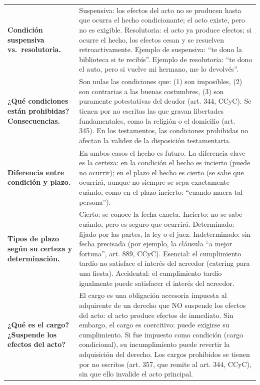 \documentclass[12pt,oneside]{book}
\begin{document}
\begin{longtable}{
    >{\raggedright\arraybackslash}p{}
    >{\raggedright\arraybackslash}X
}
\textbf{Condición suspensiva vs.\ resolutoria.} &
Suspensiva: los efectos del acto no se producen hasta que ocurra el hecho condicionante; el acto existe, pero no es exigible. Resolutoria: el acto ya produce efectos; si ocurre el hecho, los efectos cesan y se resuelven retroactivamente. Ejemplo de suspensiva: ``te dono la biblioteca si te recibís''. Ejemplo de resolutoria: ``te dono el auto, pero si vuelve mi hermano, me lo devolvés''. \\

\textbf{¿Qué condiciones están prohibidas? Consecuencias.} &
Son nulas las condiciones que: (1) son imposibles, (2) son contrarias a las buenas costumbres, (3) son puramente potestativas del deudor (art. 344, CCyC). Se tienen por no escritas las que gravan libertades fundamentales, como la religión o el domicilio (art. 345). En los testamentos, las condiciones prohibidas no afectan la validez de la disposición testamentaria. \\

\textbf{Diferencia entre condición y plazo.} &
En ambos casos el hecho es futuro. La diferencia clave es la certeza: en la condición el hecho es incierto (puede no ocurrir); en el plazo el hecho es cierto (se sabe que ocurrirá, aunque no siempre se sepa exactamente cuándo, como en el plazo incierto: ``cuando muera tal persona''). \\

\textbf{Tipos de plazo según su certeza y determinación.} &
Cierto: se conoce la fecha exacta. Incierto: no se sabe cuándo, pero es seguro que ocurrirá. Determinado: fijado por las partes, la ley o el juez. Indeterminado: sin fecha precisada (por ejemplo, la cláusula ``a mejor fortuna'', art. 889, CCyC). Esencial: el cumplimiento tardío no satisface el interés del acreedor (catering para una fiesta). Accidental: el cumplimiento tardío igualmente puede satisfacer el interés del acreedor. \\

\textbf{¿Qué es el cargo? ¿Suspende los efectos del acto?} &
El cargo es una obligación accesoria impuesta al adquirente de un derecho que NO suspende los efectos del acto: el acto produce efectos de inmediato. Sin embargo, el cargo es coercitivo: puede exigirse su cumplimiento. Si fue impuesto como condición (cargo condicional), su incumplimiento puede revertir la adquisición del derecho. Los cargos prohibidos se tienen por no escritos (art. 357, que remite al art. 344, CCyC), sin que ello invalide el acto principal. \\


\end{longtable}
\end{document}
